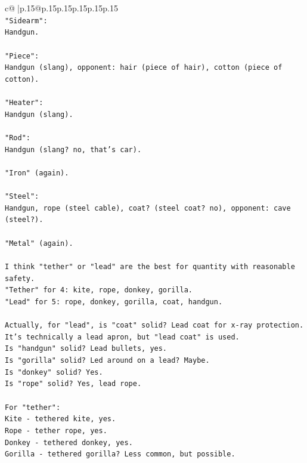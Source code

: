 \documentclass{article}
\begin{document}
{\begin{supertabular}{c@{$\;$}|p{.15\linewidth}@{}p{.15\linewidth}p{.15\linewidth}p{.15\linewidth}p{.15\linewidth}p{.15\linewidth}}
{{{\\ 
\texttt{"Sidearm":} \\
\texttt{Handgun.} \\
\\ 
\texttt{"Piece":} \\
\texttt{Handgun (slang), opponent: hair (piece of hair), cotton (piece of cotton).} \\
\\ 
\texttt{"Heater":} \\
\texttt{Handgun (slang).} \\
\\ 
\texttt{"Rod":} \\
\texttt{Handgun (slang? no, that's car).} \\
\\ 
\texttt{"Iron" (again).} \\
\\ 
\texttt{"Steel":} \\
\texttt{Handgun, rope (steel cable), coat? (steel coat? no), opponent: cave (steel?).} \\
\\ 
\texttt{"Metal" (again).} \\
\\ 
\texttt{I think "tether" or "lead" are the best for quantity with reasonable safety.} \\
\texttt{"Tether" for 4: kite, rope, donkey, gorilla.} \\
\texttt{"Lead" for 5: rope, donkey, gorilla, coat, handgun.} \\
\\ 
\texttt{Actually, for "lead", is "coat" solid? Lead coat for x{-}ray protection. It's technically a lead apron, but "lead coat" is used.} \\
\texttt{Is "handgun" solid? Lead bullets, yes.} \\
\texttt{Is "gorilla" solid? Led around on a lead? Maybe.} \\
\texttt{Is "donkey" solid? Yes.} \\
\texttt{Is "rope" solid? Yes, lead rope.} \\
\\ 
\texttt{For "tether":} \\
\texttt{Kite {-} tethered kite, yes.} \\
\texttt{Rope {-} tether rope, yes.} \\
\texttt{Donkey {-} tethered donkey, yes.} \\
\texttt{Gorilla {-} tethered gorilla? Less common, but possible.} \\
}}}
\end{supertabular}}
\end{document}
